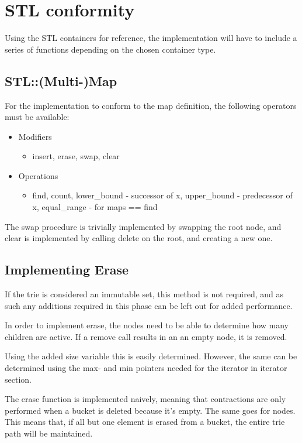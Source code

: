 \clearpage
\section{STL conformity}
Using the STL containers for reference, the implementation will have to include
a series of functions depending on the chosen container type.

\subsection{STL::(Multi-)Map}
For the implementation to conform to the map definition, the following operators
must be available:
\begin{itemize}
    \item Modifiers
        \begin{itemize}
        \item insert, erase, swap, clear
        \end{itemize}
    \item Operations
        \begin{itemize}
        \item find, count, lower\_bound - successor of x,
            upper\_bound - predecessor of x, equal\_range - for maps == find
        \end{itemize}
\end{itemize}
The swap procedure is trivially implemented by swapping the root node, and clear
is implemented by calling delete on the root, and creating a new one.

\subsection{Implementing Erase}
If the trie is considered an immutable set, this method is not required, and as such
any additions required in this phase can be left out for added performance.

In order to implement {\keyword erase}, the nodes need to be able to determine how many
children are active. If a remove call results in an an empty node, it is removed.

Using the added {\keyword size} variable this is easily determined. However,
the same can be determined using the {\keyword max}- and {\keyword min}
pointers needed for the {\keyword iterator} in iterator section.

The {\keyword erase} function is implemented naively, meaning that contractions
are only performed when a bucket is deleted because it's empty. The same goes
for nodes. This means that, if all but one element is erased from a bucket,
the entire trie path will be maintained.

